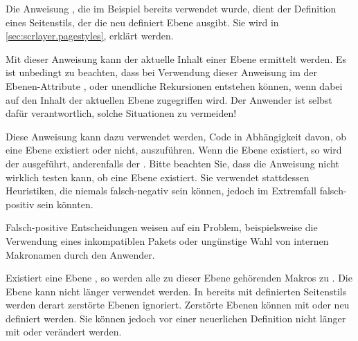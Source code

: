 Die Anweisung
, die
im Beispiel bereits verwendet wurde, dient der Definition eines Seitenstils,
der die neu definiert Ebene ausgibt. Sie wird in
\autoref{sec:scrlayer.pagestyles},
 erklärt werden.%
\EndIndexGroup


\begin{Declaration}
\end{Declaration}
Mit dieser Anweisung kann der aktuelle
Inhalt einer Ebene ermittelt werden. Es ist unbedingt zu
beachten, dass bei Verwendung dieser Anweisung im  der
Ebenen-Attribute ,  oder
 unendliche Rekursionen entstehen können, wenn dabei auf
den Inhalt der aktuellen Ebene zugegriffen wird. Der Anwender ist selbst dafür
verantwortlich, solche Situationen zu vermeiden!%
\EndIndexGroup


\begin{Declaration}
\end{Declaration}
Diese Anweisung kann dazu verwendet werden, Code in Abhängigkeit davon, ob
eine Ebene existiert oder nicht, auszuführen. Wenn die Ebene  existiert, so wird der  ausgeführt, anderenfalls der
. Bitte beachten Sie, dass die Anweisung nicht wirklich
testen kann, ob eine Ebene existiert. Sie verwendet stattdessen Heuristiken,
die niemals falsch-negativ sein können, jedoch im Extremfall falsch-positiv
sein könnten. %
\iffalse%
Nichtsdestotrotz: Falls der Test falsch-positiv ist, läuft etwas
schief. Beispielsweise könnte dies ein Indikator für die Verwendung eines
inkompatiblen Pakets oder dafür sein, dass der Anwender etwas tut, was er
besser nicht tun sollte.%
\else
Falsch-positive Entscheidungen weisen auf ein Problem, beispielsweise die
Verwendung eines inkompatiblen Pakets oder ungünstige Wahl von internen
Makronamen durch den Anwender.%
\fi
\EndIndexGroup


\begin{Declaration}
\end{Declaration}
Existiert eine Ebene , so werden alle zu dieser Ebene
gehörenden Makros zu . Die Ebene kann nicht länger verwendet
werden. In bereits mit  definierten Seitenstils werden
derart zerstörte Ebenen ignoriert. Zerstörte Ebenen können mit
 oder
 neu definiert werden. Sie können jedoch
vor einer neuerlichen Definition nicht länger mit
 oder
 verändert werden.

